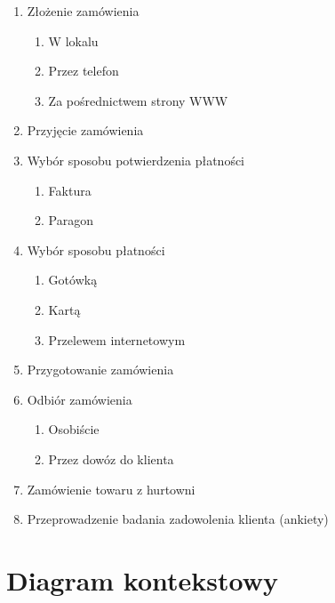 \documentclass[a4paper,12pt]{article}
\begin{document}
    \begin{enumerate}
        \item Złożenie zamówienia
        \begin{enumerate}
            \item W lokalu
            \item Przez telefon
            \item Za pośrednictwem strony WWW
        \end{enumerate}
        \item Przyjęcie zamówienia
        \item Wybór sposobu potwierdzenia płatności
        \begin{enumerate}
            \item Faktura
            \item Paragon
        \end{enumerate}
        \item Wybór sposobu płatności
        \begin{enumerate}
            \item Gotówką
            \item Kartą
            \item Przelewem internetowym
        \end{enumerate}
        \item Przygotowanie zamówienia
        \item Odbiór zamówienia
        \begin{enumerate}
            \item Osobiście
            \item Przez dowóz do klienta
        \end{enumerate}
        \item Zamówienie towaru z hurtowni
        \item Przeprowadzenie badania zadowolenia klienta (ankiety)
    \end{enumerate}

    \newpage
	\section{Diagram kontekstowy}
\end{document}
